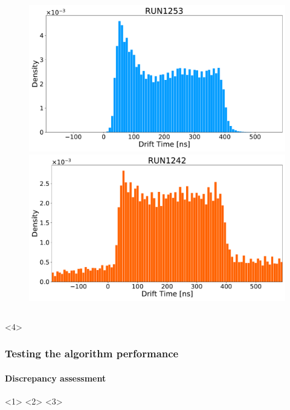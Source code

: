 \documentclass{beamer}
\begin{document}
\begin{frame}
{\begin{columns}
\begin{column}{0.5\textwidth}
					\begin{figure}
						\centering 
						\includegraphics[width=1.0\textwidth]{./Images/1253_blue.pdf}
						\includegraphics[width=1.0\textwidth]	{./Images/1242_orange.pdf}
					\end{figure}

			\end{column}
		\end{columns}
		}<4>

		\vfill

	\end{frame}

	\begin{frame}
		\frametitle{Testing the algorithm performance}
		\framesubtitle{Discrepancy assessment}

		\vspace{-1.5em}

		<1>
		<2>
		<3>
	
	\end{frame}
\end{document}
